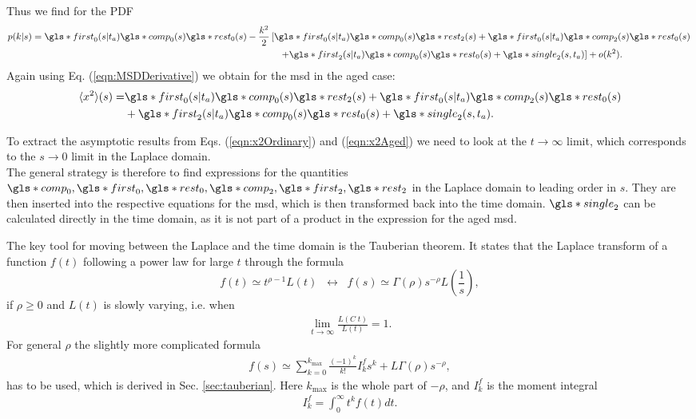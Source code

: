 %
Thus we find for the \gls*{PDF}
%
\begin{align}
\begin{split}
 p(k|s) = \gls*{first}_0(s|t_a)\gls*{comp}_0(s)\gls*{rest}_0(s) - \frac{k^2}{2} &\left[ \gls*{first}_0(s|t_a)\gls*{comp}_0(s) \gls*{rest}_2(s) +\gls*{first}_0(s|t_a)\gls*{comp}_2(s)\gls*{rest}_0(s)  \right. \\
 & \quad \left. + \gls*{first}_2(s|t_a)\gls*{comp}_0(s) \gls*{rest}_0(s) + \gls*{single}_2(s,t_a)\right] +o(k^2) .
\end{split}
\end{align}
%
Again using Eq. (\ref{eqn:MSDDerivative}) we obtain for the \gls*{msd} in the aged case:
%
\begin{align}
\begin{split}
\mean{x^2}(s) =& \gls*{first}_0(s|t_a)\gls*{comp}_0(s) \gls*{rest}_2(s) +\gls*{first}_0(s|t_a)\gls*{comp}_2(s)\gls*{rest}_0(s)  \\
& + \gls*{first}_2(s|t_a)\gls*{comp}_0(s) \gls*{rest}_0(s) + \gls*{single}_2(s,t_a)  \label{eqn:x2Aged}.
\end{split}
\end{align}

To extract the asymptotic results from Eqs. (\ref{eqn:x2Ordinary}) and (\ref{eqn:x2Aged}) we need to look at the $t \to \infty$ limit, which corresponds to the $s \to 0$ limit in the Laplace domain. \\
The general strategy is therefore to find expressions for the quantities $\gls*{comp}_0, \gls*{first}_0, \gls*{rest}_0, \gls*{comp}_2, \gls*{first}_2, \gls*{rest}_2$ in the Laplace domain to leading order in $s$. They are then inserted into the respective equations for the \gls*{msd}, which is then transformed back into the time domain. $\gls*{single}_2$ can be calculated directly in the time domain, as it is not part of a product in the expression for the aged \gls*{msd}. 

The key tool for moving between the Laplace and the time domain is the Tauberian theorem. It states that the Laplace transform of a function $f(t)$ following a power law for large $t$ through the formula 
\cite{firstSteps}
% 
\begin{equation}
 f(t) \simeq t^{\rho-1} L(t) \;\; \leftrightarrow \;\; f(s) \simeq \Gamma(\rho) s^{-\rho} L\left(\frac{1}{s}\right) \label{eqn:tauberian} ,
\end{equation}
%
if $\rho \geq 0 $ and $L(t)$ is slowly varying, i.e. when
%
\begin{align}
\lim_{t \to \infty} \frac{L(C \; t)}{L(t)} = 1 .
\end{align}
%
For general $\rho$ the slightly more complicated formula 
%
\begin{align}
 f(s) \simeq \sum_{k=0}^{k_{\max}} \frac{(-1)^k}{k!} I^{f}_k s^k + L \Gamma(\rho) s^{-\rho} ,
 \label{eqn:generalTauberian}
\end{align}
%
has to be used, which is derived in Sec. \ref{sec:tauberian}. Here $k_{\max}$ is the whole part of $-\rho$, and $I^{f}_k$ is the moment integral
%
\begin{align}
I^{f}_k = \int_0^\infty t^k f(t) dt.
\end{align}



